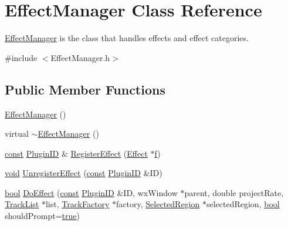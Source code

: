\hypertarget{class_effect_manager}{}\section{Effect\+Manager Class Reference}
\label{class_effect_manager}


\hyperlink{class_effect_manager}{Effect\+Manager} is the class that handles effects and effect categories.  




{\ttfamily \#include $<$Effect\+Manager.\+h$>$}

\subsection*{Public Member Functions}
\begin{DoxyCompactItemize}
\item 
\hyperlink{class_effect_manager_ac273c81141b1f393d081202316a5500b}{Effect\+Manager} ()
\item 
virtual \hyperlink{class_effect_manager_af1bf9209514e076eb15c5502bc668311}{$\sim$\+Effect\+Manager} ()
\item 
\hyperlink{getopt1_8c_a2c212835823e3c54a8ab6d95c652660e}{const} \hyperlink{include_2audacity_2_types_8h_abe9b737fcebc2b5bea606246e1eab52e}{Plugin\+ID} \& \hyperlink{class_effect_manager_aed1ecc709cdbfde1b51586f1eb17f132}{Register\+Effect} (\hyperlink{class_effect}{Effect} $\ast$\hyperlink{checksum_8c_ae747d72a1a803f5ff4a4b2602857d93b}{f})
\item 
\hyperlink{sound_8c_ae35f5844602719cf66324f4de2a658b3}{void} \hyperlink{class_effect_manager_ae528afab11462141dc580d037fcd5246}{Unregister\+Effect} (\hyperlink{getopt1_8c_a2c212835823e3c54a8ab6d95c652660e}{const} \hyperlink{include_2audacity_2_types_8h_abe9b737fcebc2b5bea606246e1eab52e}{Plugin\+ID} \&ID)
\item 
\hyperlink{mac_2config_2i386_2lib-src_2libsoxr_2soxr-config_8h_abb452686968e48b67397da5f97445f5b}{bool} \hyperlink{class_effect_manager_ab6ecf667e5090b89ad9da94e429d0b64}{Do\+Effect} (\hyperlink{getopt1_8c_a2c212835823e3c54a8ab6d95c652660e}{const} \hyperlink{include_2audacity_2_types_8h_abe9b737fcebc2b5bea606246e1eab52e}{Plugin\+ID} \&ID, wx\+Window $\ast$parent, double project\+Rate, \hyperlink{class_track_list}{Track\+List} $\ast$list, \hyperlink{class_track_factory}{Track\+Factory} $\ast$factory, \hyperlink{class_selected_region}{Selected\+Region} $\ast$selected\+Region, \hyperlink{mac_2config_2i386_2lib-src_2libsoxr_2soxr-config_8h_abb452686968e48b67397da5f97445f5b}{bool} should\+Prompt=\hyperlink{mac_2config_2i386_2lib-src_2libsoxr_2soxr-config_8h_a41f9c5fb8b08eb5dc3edce4dcb37fee7}{true})

\end{DoxyCompactItemize}
